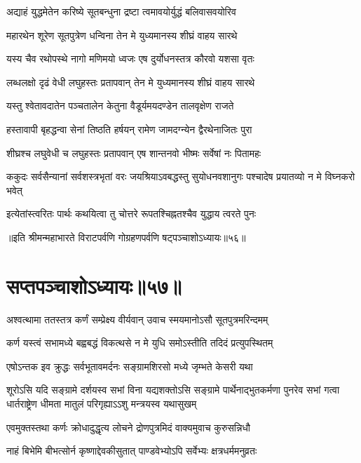 \twolineshloka
{अद्याहं युद्धमेतेन करिष्ये सूतबन्धुना}
{द्रष्टा त्वमावयोर्युद्धं बलिवासवयोरिव}


\twolineshloka
{महारथेन शूरेण सूतपुत्रेण धन्विना}
{तेन मे युध्यमानस्य शीघ्रं वाहय सारथे}


\twolineshloka
{यस्य चैव रथोपस्थे नागो मणिमयो ध्वजः}
{एष दुर्योधनस्तत्र कौरवो यशसा वृतः}


\twolineshloka
{लब्धलक्षो दृढं वेधी लघुहस्तः प्रतापवान्}
{तेन मे युध्यमानस्य शीघ्रं वाहय सारथे}


\twolineshloka
{यस्तु श्वेतावदातेन पञ्चतालेन केतुना}
{वैडूर्यमयदण्डेन तालवृक्षेण राजते}


\twolineshloka
{हस्तावापी बृहद्धन्वा सेनां तिष्ठति हर्षयन्}
{रामेण जामदग्न्येन द्वैरथेनाजितः पुरा}


\twolineshloka
{शीघ्रश्च लघुवेधी च लघुहस्तः प्रतापवान्}
{एष शान्तनवो भीष्मः सर्वेषां नः पितामहः}


\threelineshloka
{ककुदः सर्वसैन्यानां सर्वशस्त्रभृतां वरः}
{जयश्रियाऽवबद्धस्तु सुयोधनवशानुगः}
{पश्चादेष प्रयातव्यो न मे विघ्नकरो भवेत्}


\twolineshloka
{इत्येतांस्त्वरितः पार्थः कथयित्वा तु चोत्तरे}
{रूपतश्चिह्नतश्चैव युद्धाय त्वरते पुनः}

॥इति श्रीमन्महाभारते विराटपर्वणि गोग्रहणपर्वणि षट्पञ्चाशोऽध्यायः॥५६॥

\chapter{सप्तपञ्चाशोऽध्यायः॥५७॥}

\twolineshloka
{अश्वत्थामा ततस्तत्र कर्णं सम्प्रेक्ष्य वीर्यवान्}
{उवाच स्मयमानोऽसौ सूतपुत्रमरिन्दमम्}


\twolineshloka
{कर्ण यस्त्वं सभामध्ये बह्वबद्धं विकत्थसे}
{न मे युधि समोऽस्तीति तदिदं प्रत्युपस्थितम्}


\twolineshloka
{एषोऽन्तक इव क्रुद्धः सर्वभूतावमर्दनः}
{सङ्ग्रामशिरसो मध्ये जृम्भते केसरी यथा}


\onelineshloka
{शूरोऽसि यदि सङ्ग्रामे दर्शयस्व सभां विना}
\threelineshloka
{यद्यशक्तोऽसि सङ्ग्रामे पार्थेनाद्भुतकर्मणा}
{पुनरेव सभां गत्वा धार्तराष्ट्रेण धीमता}
{मातुलं परिगृह्याऽऽशु मन्त्रयस्व यथासुखम्}



\twolineshloka
{एवमुक्तस्तथा कर्णः क्रोधादुद्धृत्य लोचने}
{द्रोणपुत्रमिदं वाक्यमुवाच कुरुसन्निधौ}


\twolineshloka
{नाहं बिभेमि बीभत्सोर्न कृष्णाद्देवकीसुतात्}
{पाण्डवेभ्योऽपि सर्वेभ्यः क्षत्रधर्ममनुव्रतः}


